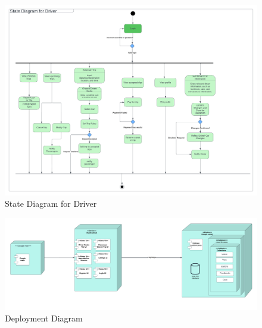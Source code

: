 \documentclass[a4paper, 12pt]{report} %
\begin{document}
        \FloatBarrier

       \begin{figure}
            \centering
            \includegraphics[width=\linewidth]{Images/State Diagram Driver.png}
            \caption{State Diagram for Driver}
            \label{fig:state_driver}
        \end{figure}

        \FloatBarrier

        \begin{figure}
            \centering
            \includegraphics[width=\linewidth]{Images/deployment_diagram.png}
            \caption{Deployment Diagram}
            \label{fig:dep_diagram}
        \end{figure}

        \FloatBarrier
        

\end{document}
